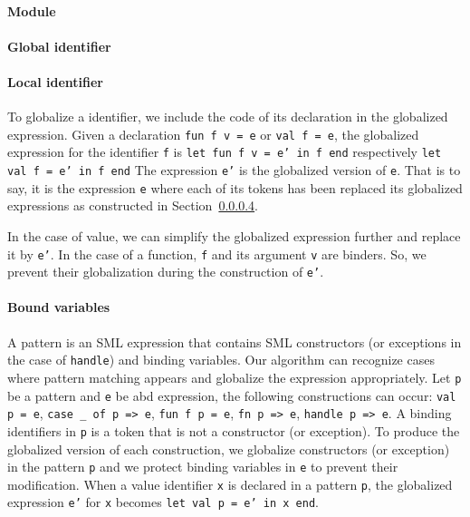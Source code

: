 \documentclass[runningheads,a4paper,draft]{svjour3}
\def\sml{\textsf{SML}\xspace}
\begin{document}
\paragraph{Module}



\paragraph{Global identifier}




\paragraph{Local identifier}

To globalize a identifier, we include 
the code of its declaration in the globalized expression. 
Given a declaration \texttt{fun f v = e} or \texttt{val f = e}, the globalized 
expression for the identifier \texttt{f} is \texttt{let fun f v = e' in f 
end} respectively \texttt{let val f = e' in f end}
The expression \texttt{e'} is the globalized version of \texttt{e}. That is to 
say, it is the expression \texttt{e} where each of its tokens has been replaced 
its globalized expressions as constructed in Section~\ref{}.


In the case of value, we can simplify the globalized expression further and 
replace it by \texttt{e'}.
In the case of a function, \texttt{f} and its argument \texttt{v} are binders. 
So, we prevent their globalization during the construction of \texttt{e'}.

\paragraph{Bound variables}
A pattern is an \sml expression that 
contains \sml 
constructors (or exceptions in the case of \texttt{handle}) and binding 
variables. Our algorithm can recognize cases where pattern matching appears and 
globalize the expression appropriately.  Let \texttt{p} be a pattern 
and 
\texttt{e} be abd expression, the following constructions can 
occur: \texttt{val p = e}, \texttt{case \_ of p => e}, \texttt{fun f p = e}, 
\texttt{fn p => e}, \texttt{handle p => e}. A binding identifiers in \texttt{p}
is a token that is not a constructor (or exception). To produce the globalized 
version of each construction, we globalize constructors (or exception) in the 
pattern \texttt{p} and we protect binding variables in \texttt{e} to prevent 
their modification. When a value identifier \texttt{x} is declared in a pattern 
\texttt{p}, the globalized expression \texttt{e'} for \texttt{x} becomes 
\texttt{let val p = e' in x 
end}.                                                                           
                                                                                
\end{document}
